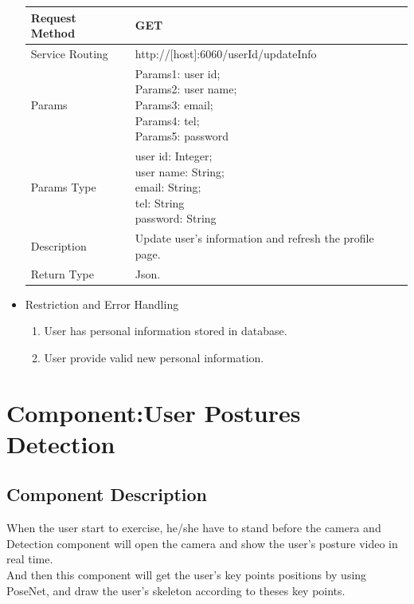 \documentclass[16pt]{scrreprt}
\begin{document}
\begin{itemize}
    \begin{center}
    \begin{tabular}{p{5cm}p{10cm}}
        \hline
        Request Method & GET\\
        \hline
        Service Routing &  http://[host]:6060/{userId}/updateInfo\\
        \hline
        Params & \makecell[l]{Params1: user id;\\Params2: user name;\\Params3: email;\\Params4: tel;\\Params5: password}\\ 
        \hline
        Params Type & \makecell[l]{user id: Integer;\\user name: String;\\email: String;\\tel: String\\password: String}\\
        \hline
        Description & Update user's information and refresh the profile page.\\
        \hline
        Return Type & Json.\\
        \hline
    \end{tabular}
\end{center}
\item Restriction and Error Handling\\
\begin{enumerate}
    \item User has personal information stored in database.
    \item User provide valid new personal information.
\end{enumerate} 
\end{itemize}

\section{Component:User Postures Detection}
\subsection{Component Description}
When the user start to exercise, he/she have to stand before the camera and Detection component will open the camera and show the user's posture video in real time. \\

\noindent And then this component will get the user's key points positions by using PoseNet, and draw the user's skeleton according to theses key points.\\
\end{document}
